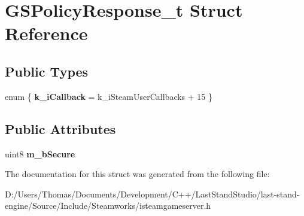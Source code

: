 \hypertarget{structGSPolicyResponse__t}{}\section{G\+S\+Policy\+Response\+\_\+t Struct Reference}
\label{structGSPolicyResponse__t}
\subsection*{Public Types}
\begin{DoxyCompactItemize}
\item 
\hypertarget{structGSPolicyResponse__t_a05c0025939f9651244ea98c347f58a9b}{}enum \{ {\bfseries k\+\_\+i\+Callback} = k\+\_\+i\+Steam\+User\+Callbacks + 15
 \}\label{structGSPolicyResponse__t_a05c0025939f9651244ea98c347f58a9b}

\end{DoxyCompactItemize}
\subsection*{Public Attributes}
\begin{DoxyCompactItemize}
\item 
\hypertarget{structGSPolicyResponse__t_abf8010b9749a18285a48f8f76ba3a323}{}uint8 {\bfseries m\+\_\+b\+Secure}\label{structGSPolicyResponse__t_abf8010b9749a18285a48f8f76ba3a323}

\end{DoxyCompactItemize}


The documentation for this struct was generated from the following file\+:\begin{DoxyCompactItemize}
\item 
D\+:/\+Users/\+Thomas/\+Documents/\+Development/\+C++/\+Last\+Stand\+Studio/last-\/stand-\/engine/\+Source/\+Include/\+Steamworks/isteamgameserver.\+h\end{DoxyCompactItemize}
